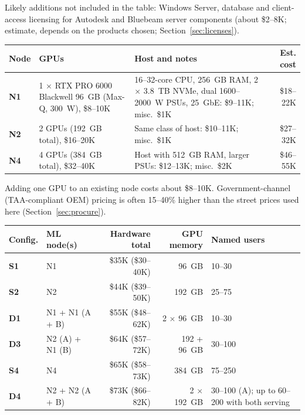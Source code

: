 Likely additions not included in the table: Windows Server, database and client-access
licensing for Autodesk and Bluebeam server components (about \$2--8K; estimate, depends on
the products chosen; Section~\ref{sec:licenses}).


{\footnotesize
\begin{xltabular}{\textwidth}{@{}l Y{0.833} Y{1.167} r@{}}
  \toprule
  Node & GPUs & Host and notes & Est. cost \\
  \midrule
  \endhead
  \textbf{N1} & 1 $\times$ RTX PRO 6000 Blackwell 96~GB (Max-Q, 300~W), \$8--10K & 16--32-core CPU, 256~GB RAM, 2 $\times$ 3.8~TB NVMe, dual 1600--2000~W PSUs, 25~GbE: \$9--11K; misc.\ \$1K & \$18--22K \\
  \textbf{N2} & 2 GPUs (192~GB total), \$16--20K & Same class of host: \$10--11K; misc.\ \$1K & \$27--32K \\
  \textbf{N4} & 4 GPUs (384~GB total), \$32--40K & Host with 512~GB RAM, larger PSUs: \$12--13K; misc.\ \$2K & \$46--55K \\
  \bottomrule
\end{xltabular}}

Adding one GPU to an existing node costs about \$8--10K. Government-channel
(TAA-compliant OEM) pricing is often 15--40\% higher than the street prices used
here (Section~\ref{sec:procure}).


{\footnotesize
\begin{xltabular}{\textwidth}{@{}l Y{0.8} r r Y{1.2}@{}}
  \toprule
  Config. & ML node(s) & Hardware total & GPU memory & Named users \\
  \midrule
  \endhead
  \textbf{S1} & N1 & \$35K (\$30--40K) & 96~GB & 10--30 \\
  \textbf{S2} & N2 & \$44K (\$39--50K) & 192~GB & 25--75 \\
  \textbf{D1} & N1 + N1 (A + B) & \$55K (\$48--62K) & 2 $\times$ 96~GB & 10--30 \\
  \textbf{D3} & N2 (A) + N1 (B) & \$64K (\$57--72K) & 192 + 96~GB & 30--100 \\
  \textbf{S4} & N4 & \$65K (\$58--73K) & 384~GB & 75--250 \\
  \textbf{D4} & N2 + N2 (A + B) & \$73K (\$66--82K) & 2 $\times$ 192~GB & 30--100 (A); up to 60--200 with both serving \\
  \bottomrule
\end{xltabular}}

